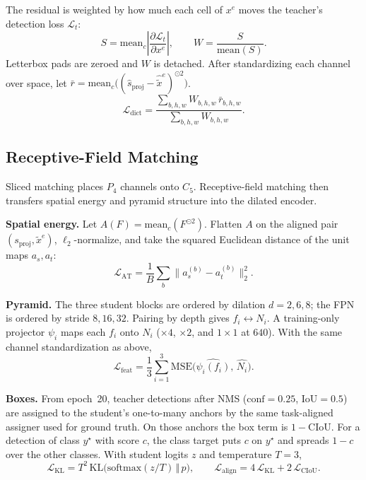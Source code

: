 The residual is weighted by how much each cell of \(x^{e}\) moves the teacher's detection loss \(\mathcal{L}_t\):
\begin{equation}
\label{eq:saliency}
S=\mathrm{mean}_{c}\left|\frac{\partial \mathcal{L}_t}{\partial x^{e}}\right|,\qquad
W=\frac{S}{\mathrm{mean}(S)}.
\end{equation}
Letterbox pads are zeroed and \(W\) is detached.
After standardizing each channel over space, let \(\bar{r}=\mathrm{mean}_{c}\bigl((\hat{s}_{\mathrm{proj}}-\hat{\tilde{x}}^{e})^{\odot 2}\bigr)\).
\begin{equation}
\label{eq:ldict}
\mathcal{L}_{\mathrm{dict}}
=\frac{\sum_{b,h,w} W_{b,h,w}\,\bar{r}_{b,h,w}}{\sum_{b,h,w} W_{b,h,w}}.
\end{equation}

\subsection{Receptive-Field Matching}
\label{sec:rf}

Sliced matching places \(P_4\) channels onto \(C_5\).
Receptive-field matching then transfers spatial energy and pyramid structure into the dilated encoder.

\textbf{Spatial energy.}
Let \(A(F)=\mathrm{mean}_{c}(F^{\odot 2})\).
Flatten \(A\) on the aligned pair \((s_{\mathrm{proj}},\tilde{x}^{e})\), \(\ell_2\)-normalize, and take the squared Euclidean distance of the unit maps \(a_s,a_t\):
\begin{equation}
\label{eq:lat}
\mathcal{L}_{\mathrm{AT}}
=\frac{1}{B}\sum_{b}\lVert a_s^{(b)}-a_t^{(b)}\rVert_{2}^{2}.
\end{equation}

\textbf{Pyramid.}
The three student blocks are ordered by dilation \(d=2,6,8\); the FPN is ordered by stride \(8,16,32\).
Pairing by depth gives \(f_i\leftrightarrow N_i\).
A training-only projector \(\psi_i\) maps each \(f_i\) onto \(N_i\) (\(\times 4\), \(\times 2\), and \(1\times 1\) at \(640\)).
With the same channel standardization as above,
\begin{equation}
\label{eq:lfeat}
\mathcal{L}_{\mathrm{feat}}
=\frac{1}{3}\sum_{i=1}^{3}
\mathrm{MSE}\bigl(\widehat{\psi_i(f_i)},\,\widehat{N_i}\bigr).
\end{equation}

\textbf{Boxes.}
From epoch~20, teacher detections after NMS (\(\mathrm{conf}=0.25\), \(\mathrm{IoU}=0.5\)) are assigned to the student's one-to-many anchors by the same task-aligned assigner used for ground truth.
On those anchors the box term is \(1-\mathrm{CIoU}\).
For a detection of class \(y^{\star}\) with score \(c\), the class target puts \(c\) on \(y^{\star}\) and spreads \(1-c\) over the other classes.
With student logits \(z\) and temperature \(T=3\),
\begin{equation}
\label{eq:lalign}
\mathcal{L}_{\mathrm{KL}}
=T^{2}\,\mathrm{KL}\bigl(\mathrm{softmax}(z/T)\,\Vert\,p\bigr),\qquad
\mathcal{L}_{\mathrm{align}}
=4\,\mathcal{L}_{\mathrm{KL}}+2\,\mathcal{L}_{\mathrm{CIoU}}.
\end{equation}

